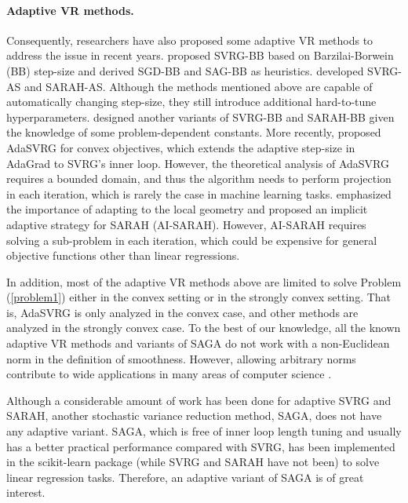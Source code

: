 \documentclass[letterpaper]{article} %
\begin{document}
\paragraph{Adaptive VR methods.}
Consequently, researchers have also proposed some adaptive VR methods to address the issue in recent years.
%
\citet{DBLP:conf/nips/TanMDQ16} proposed SVRG-BB based on Barzilai-Borwein (BB) step-size \citep{barzilai1988two} and derived SGD-BB and SAG-BB as heuristics.
%
\citet{c:21} developed SVRG-AS and SARAH-AS.
%
Although the methods mentioned above are capable of automatically changing step-size, they still introduce additional hard-to-tune hyperparameters.
%
\citet{DBLP:conf/icml/LiWG20} designed another variants of SVRG-BB and SARAH-BB given the knowledge of some problem-dependent constants.
%
More recently, \citet{DBLP:journals/corr/abs-2102-09645} proposed AdaSVRG for convex objectives, which extends the adaptive step-size in AdaGrad to SVRG's inner loop.
%
However, the theoretical analysis of AdaSVRG requires a bounded domain, and thus the algorithm needs to perform projection in each iteration, which is rarely the case in machine learning tasks.
%
\citet{DBLP:journals/corr/abs-2102-09700} emphasized the importance of adapting to the local geometry and proposed an implicit adaptive strategy for SARAH (AI-SARAH).
%
However, AI-SARAH requires solving a sub-problem in each iteration, which could be expensive for general objective functions other than linear regressions.

In addition, most of the adaptive VR methods above are limited to solve Problem (\ref{problem1}) either in the convex setting or in the strongly convex setting.
%
That is, AdaSVRG is only analyzed in the convex case, and other methods are analyzed in the strongly convex case.
%
To the best of our knowledge, all the known adaptive VR methods and variants of SAGA do not work with a non-Euclidean norm in the definition of smoothness.
%
However, allowing arbitrary norms contribute to wide applications in many areas of computer science \citep{allen2014linear}.

Although a considerable amount of work has been done for adaptive SVRG and SARAH, another stochastic variance reduction method, SAGA, does not have any adaptive variant. 
%
SAGA, which is free of inner loop length tuning and usually has a better practical performance compared with SVRG, has been implemented in the scikit-learn package \citep{scikit-learn} (while SVRG and SARAH have not been) to solve linear regression tasks.
%
Therefore, an adaptive variant of SAGA is of great interest.

 

\bigskip
\end{document}
